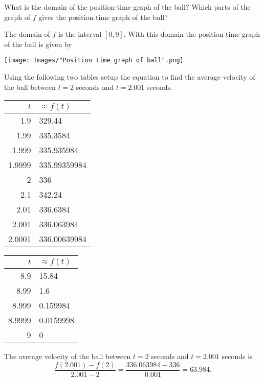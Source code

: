 \documentclass[nooutcomes]{ximera}
\renewenvironment{freeResponse}{
\ifhandout\setbox0\vbox\bgroup\else
\begin{trivlist}\item[\hskip \labelsep\bfseries Solution:\hspace{2ex}]
\fi}
{\ifhandout\egroup\else
\end{trivlist}
\fi}
\begin{document}
\begin{problem}
\begin{itemize}
    \item[(d)]
      What is the domain of the position-time graph of the ball?
      Which parts of the graph of $f$ gives the position-time graph of the ball?
      \begin{freeResponse}
        The domain of $f$ is the interval $[0, 9]$.
        With this domain the position-time graph of the ball is given by
        \begin{center}
          \texttt{[image: Images/"Position time graph of ball".png]}
        \end{center}
      \end{freeResponse}


    \item[(e)]
      Using the following two tables setup the equation to find the average velocity of the ball between $t = 2$ seconds and $t = 2.001$ seconds.
      \begin{center}
    \begin{tabular}[c]{rl}
      \toprule
      $t$ & $\approx f(t)$\\
      \midrule
      1.9 & 329.44\\
      1.99 & 335.3584\\
      1.999 & 335.935984\\
      1.9999 & 335.99359984\\
      2 & 336 \\
      2.1 & 342.24\\
      2.01 & 336.6384\\
      2.001 & 336.063984\\
      2.0001 & 336.00639984\\
      \bottomrule
    \end{tabular}
    \hspace{1in}
    \begin{tabular}[c]{rl}
      \toprule
      $t$ & $\approx f(t)$\\
      \midrule
      8.9 & 15.84\\
      8.99 & 1.6\\
      8.999 & 0.159984\\
      8.9999 & 0.0159998\\
      9 & 0 \\
      \bottomrule
    \end{tabular}
  \end{center}
  \begin{freeResponse}
    The average velocity of the ball between $t = 2$ seconds and $t = 2.001$ seconds is
    \[
       \frac{f(2.001) - f(2)}{2.001 - 2} = \frac{336.063984 - 336}{0.001} = 63.984.
    \]
  \end{freeResponse}



\end{itemize}
\end{problem}
\end{document}
